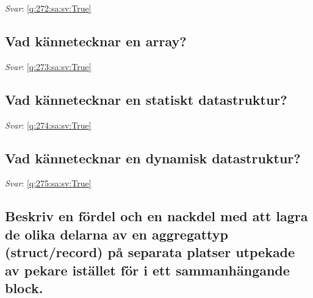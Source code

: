 \documentclass[a4paper,11pt,oneside]{article}
\begin{document}
\begin{sloppypar}
\textit{Svar}: \autoref{q:272:sa:sv:True}



\subsection{Vad k\"annetecknar en array?}

\label{q:273:sa:sv:False}

\vspace{2cm}

\noindent\makebox[\textwidth]{\hrulefill}

\vspace{1cm}

\textit{Svar}: \autoref{q:273:sa:sv:True}



\subsection{Vad k\"annetecknar en statiskt datastruktur?}

\label{q:274:sa:sv:False}

\vspace{2cm}

\noindent\makebox[\textwidth]{\hrulefill}

\vspace{1cm}

\textit{Svar}: \autoref{q:274:sa:sv:True}



\subsection{Vad k\"annetecknar en dynamisk datastruktur?}

\label{q:275:sa:sv:False}

\vspace{2cm}

\noindent\makebox[\textwidth]{\hrulefill}

\vspace{1cm}

\textit{Svar}: \autoref{q:275:sa:sv:True}



\subsection{Beskriv en f\"ordel och en nackdel med att lagra de olika delarna av en aggregattyp (struct/record) p\r{a} separata platser utpekade av pekare ist\"allet f\"or i ett sammanh\"angande block.}


\end{sloppypar}
\end{document}
